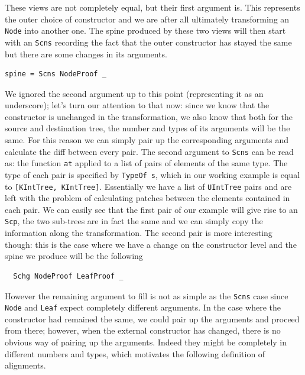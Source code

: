 \documentclass[11pt, titlepage]{article}
\newcommand{\toHaskell}[1]{\texttt{#1}\xspace}
\begin{document}
These views are not completely equal, but their first argument is. This represents the outer choice 
of constructor and we are after all ultimately transforming an \texttt{Node} into another one. The spine produced
by these two views will then start with an \texttt{Scns} recording the fact that 
the outer constructor has stayed the same but there are some changes in its 
arguments.

\begin{verbatim}
spine = Scns NodeProof _
\end{verbatim}

We ignored the second argument up to this point (representing it as an underscore); let's turn our attention to 
that now: since we know that the constructor is unchanged in the transformation, we also know that 
both for the source and destination tree, the number and types of its arguments 
will be the same. For this reason we can simply pair up the corresponding 
arguments and calculate the diff between every pair. The second argument to \texttt{Scns} can be read as: the function 
\texttt{at} applied to a list of pairs of elements of the same type. The type of each 
pair is specified by \texttt{TypeOf s}, which in our working example is equal to 
\toHaskell{[KIntTree, KIntTree]}. Essentially we have a list of \texttt{UIntTree} pairs and are left with the problem of calculating patches between the elements contained in 
each pair. 
We can easily see that the first pair of our example will give rise to an \texttt{Scp}, the two sub-trees are in fact the same and we can simply copy the information along the transformation. 
The second pair is more interesting though: this is the case where we have a change on the constructor level and the spine we produce will be the following

\begin{verbatim}
  Schg NodeProof LeafProof _
\end{verbatim}

However the remaining argument to fill is not as simple as the \texttt{Scns} case since \texttt{Node} and \texttt{Leaf} expect completely different 
arguments.
In the case where the constructor had remained the same, we could 
pair up the arguments and proceed from there; however, when the
external constructor has changed, there is no obvious way of pairing up
the arguments. Indeed they might be completely in different numbers and types, which 
motivates the following definition of alignments.
\end{document}
